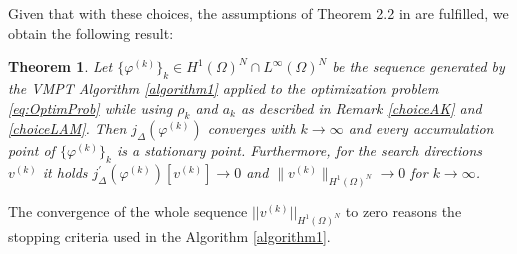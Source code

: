 \documentclass[a4paper,11pt]{article}
\newtheorem{theorem}{Theorem}%
\theoremstyle{remark}
\newcommand{\phik}{\varphi^{(k)}}
\newcommand{\HON}{H^1(\Omega)^N }
\newcommand{\LinfN}{L^\infty(\Omega)^N}
\begin{document}
\medskip
Given that with these choices, the assumptions of Theorem 2.2 in \cite{VMPT} are fulfilled, we obtain the following result:
\begin{theorem}
\label{VMPTprop}
Let $\{\phik \}_k \in \HON \cap \LinfN$ be the sequence generated by the VMPT
Algorithm \ref{algorithm1}
applied to the optimization problem
\eqref{eq:OptimProb} while
using $\rho_k$
and $a_k$ as described in Remark \ref{choiceAK} and \ref{choiceLAM}.
Then $j_\Delta(\phik )$ converges with $k\to \infty$ and every accumulation point of $\{\phik \}_k$ is a stationary point.
Furthermore, for the search directions $v^{(k)}$ it holds $j^\prime_\Delta(\phik )[v^{(k)}] \rightarrow 0$ and $\| v^{(k)}\|_{\HON}\rightarrow 0$ for $k \to \infty$.
\end{theorem}
The convergence of the whole sequence $|| v^{(k)}||_{\HON}$ to zero reasons the stopping criteria used in the Algorithm \ref{algorithm1}.
\medskip
\medskip
\end{document}
